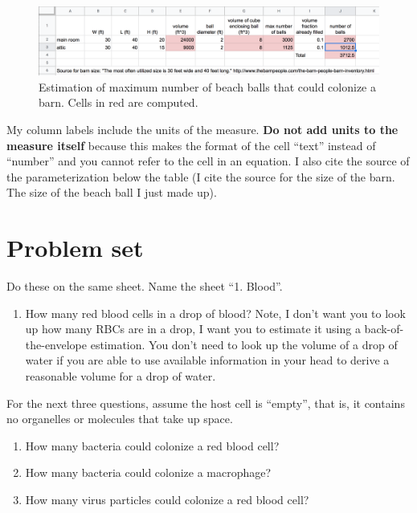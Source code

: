 \documentclass[]{book}
\providecommand{\tightlist}{%
  \setlength{\itemsep}{0pt}\setlength{\parskip}{0pt}}
\begin{document}
\begin{figure}

{\centering \includegraphics[width=0.8\linewidth]{images/balls} 

}

\caption{Estimation of maximum number of beach balls that could colonize a barn. Cells in red are computed.}\label{fig:balls}
\end{figure}

My column labels include the units of the measure. \textbf{Do not add
units to the measure itself} because this makes the format of the cell
``text'' instead of ``number'' and you cannot refer to the cell in an
equation. I also cite the source of the parameterization below the table
(I cite the source for the size of the barn. The size of the beach ball
I just made up).

\section{Problem set}\label{problem-set}

Do these on the same sheet. Name the sheet ``1. Blood''.

\begin{enumerate}
\def\labelenumi{\arabic{enumi}.}
\tightlist
\item
  How many red blood cells in a drop of blood? Note, I don't want you to
  look up how many RBCs are in a drop, I want you to estimate it using a
  back-of-the-envelope estimation. You don't need to look up the volume
  of a drop of water if you are able to use available information in
  your head to derive a reasonable volume for a drop of water.
\end{enumerate}

For the next three questions, assume the host cell is ``empty'', that
is, it contains no organelles or molecules that take up space.

\begin{enumerate}
\def\labelenumi{\arabic{enumi}.}
\setcounter{enumi}{1}
\item
  How many bacteria could colonize a red blood cell?
\item
  How many bacteria could colonize a macrophage?
\item
  How many virus particles could colonize a red blood cell?
\end{enumerate}
\end{document}
